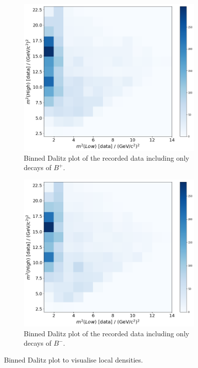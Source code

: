 \begin{figure}
  \centering
  \begin{subfigure}[b]{0.45\textwidth}
      \centering
      \includegraphics[width=\textwidth]{"content/pics/binned_dalitz_no_charm_p.png"}
      \caption{Binned Dalitz plot of the recorded data including only decays of $B^+$.}
  \end{subfigure}
  \hfill
  \begin{subfigure}[b]{0.45\textwidth}
      \centering
      \includegraphics[width=\textwidth]{"content/pics/binned_dalitz_no_charm_m.png"}
      \caption{Binned Dalitz plot of the recorded data including only decays of $B^-$.}
  \end{subfigure}
     \caption{Binned Dalitz plot to visualise local densities.}
     \label{fig:binned_dalitz_no_charm}
\end{figure}
